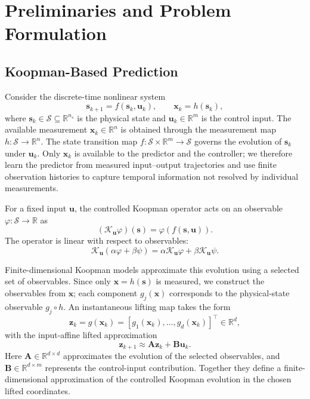 \documentclass[journal]{IEEEtran}
\theoremstyle{plain}
\theoremstyle{definition}
\newcommand{\vx}{\mathbf{x}}
\newcommand{\vu}{\mathbf{u}}
\newcommand{\vs}{\mathbf{s}}
\newcommand{\vz}{\mathbf{z}}
\newcommand{\mA}{\mathbf{A}}
\newcommand{\mB}{\mathbf{B}}
\newcommand{\R}{\mathbb{R}}
\begin{document}
\endgroup

\section{Preliminaries and Problem Formulation}
\label{sec:prelim}
\subsection{Koopman-Based Prediction}
\label{subsec:koopman_prelim}
Consider the discrete-time nonlinear system
\begin{equation}
\vs_{k+1}=f(\vs_k,\vu_k),\qquad \vx_k=h(\vs_k),
\label{eq:nonlinear_system}
\end{equation}
where $\vs_k\in\mathcal S\subseteq\R^{n_s}$ is the physical state and $\vu_k\in\R^m$ is the control input. The available measurement $\vx_k\in\R^n$ is obtained through the measurement map $h:\mathcal S\to\R^n$. The state transition map $f:\mathcal S\times\R^m\to\mathcal S$ governs the evolution of $\vs_k$ under $\vu_k$. Only $\vx_k$ is available to the predictor and the controller; we therefore learn the predictor from measured input--output trajectories and use finite observation histories to capture temporal information not resolved by individual measurements.

For a fixed input $\vu$, the controlled Koopman operator acts on an observable $\varphi:\mathcal S\to\R$ as \cite{koopman1931hamiltonian,mezic2005spectral,brunton2022modern}
\begin{equation}
(\mathcal K_{\vu}\varphi)(\vs)=\varphi(f(\vs,\vu)).
\label{eq:koopman_operator}
\end{equation}
The operator is linear with respect to observables:
\begin{equation}
\mathcal K_{\vu}(\alpha\varphi+\beta\psi)=\alpha\mathcal K_{\vu}\varphi+\beta\mathcal K_{\vu}\psi.
\label{eq:koopman_linearity}
\end{equation}

Finite-dimensional Koopman models approximate this evolution using a selected set of observables. Since only $\vx=h(\vs)$ is measured, we construct the observables from $\vx$; each component $g_j(\vx)$ corresponds to the physical-state observable $g_j\circ h$. An instantaneous lifting map takes the form
\begin{equation}
\vz_k=g(\vx_k)=[g_1(\vx_k),\ldots,g_d(\vx_k)]^\top\in\R^d,
\label{eq:instantaneous_lifting}
\end{equation}
with the input-affine lifted approximation
\begin{equation}
\vz_{k+1}\approx\mA\vz_k+\mB\vu_k.
\label{eq:linear_lifted}
\end{equation}
Here $\mA\in\R^{d\times d}$ approximates the evolution of the selected observables, and $\mB\in\R^{d\times m}$ represents the control-input contribution. Together they define a finite-dimensional approximation of the controlled Koopman evolution in the chosen lifted coordinates.
\end{document}
